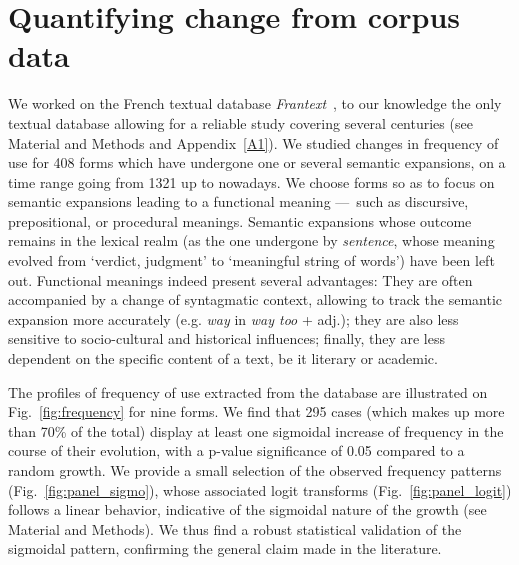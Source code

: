 \documentclass[12pt,twocolumn,amsmath,amssymb,aps,longbibliography]{revtex4-1}  %
\newcommand{\tit}{\textit}
\begin{document}
\section*{Quantifying change from corpus data}

We worked on the French textual database {\em Frantext}~\cite{frantext}, to our knowledge the only textual database allowing for a reliable study covering several centuries (see Material and Methods and Appendix~\ref{A1}).  We studied changes in frequency of use for 408 forms which have undergone one or several semantic expansions, on a time range going from 1321 up to nowadays. We choose forms so as to focus on semantic expansions leading to a functional meaning ---~such as discursive, prepositional, or procedural meanings. Semantic expansions whose outcome remains in the lexical realm (as the one undergone by \tit{sentence}, whose meaning evolved from `verdict, judgment' to `meaningful string of words') have been left out. Functional meanings indeed present several advantages: They are often accompanied by a change of syntagmatic context, allowing to track the semantic expansion more accurately (e.g. \tit{way} in \tit{way too} + adj.); they are also less sensitive to socio-cultural and historical influences; finally, they are less dependent on the specific content of a text, be it literary or academic.

The profiles of frequency of use extracted from the database are illustrated on Fig.~\ref{fig:frequency} for nine forms. We find that 295 cases (which makes up more than 70\% of the total) display at least one sigmoidal increase of frequency in the course of their evolution, with a p-value significance of 0.05 compared to a random growth. We provide a small selection of the observed frequency patterns (Fig.~\ref{fig:panel_sigmo}), whose associated logit transforms (Fig.~\ref{fig:panel_logit}) follows a linear behavior, indicative of the sigmoidal nature of the growth (see Material and Methods). We thus find a robust statistical validation of the sigmoidal pattern, confirming the general claim made in the literature. 

\begin{figure*}[!tbp]
\caption{\small Frequency evolution on the whole time range (1321-2020) of nine different forms. Each blue bar shows the frequency associated to a decade. Frequency has been multiplied by a $10^5$ factor for an easier reading.}
\label{fig:frequency}
\end{figure*}
\end{document}
